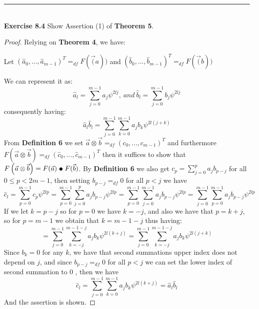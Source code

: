 \documentclass[a4paper]{article}
\begin{document}
\noindent\rule{12cm}{0.4pt}\\
\noindent \textbf{Exercise 8.4}  Show Assertion (1) of \textbf{Theorem 5}.
\begin{proof}
Relying on \textbf{Theorem 4}, we have:
\begin{center}
Let $(\widehat{a}_0,...,\widehat{a}_{m-1})^{T} =_{df}F(\vec(a))$ and $(\widehat{b}_0,...,\widehat{b}_{m-1})^{T} =_{df}F(\vec(b))$
\end{center}
We can represent it as:
$$\widehat{a}_l = \sum_{j=0}^{m-1}a_j\psi^{2lj},\ and\ \widehat{b}_l = \sum_{j=0}^{m-1}b_j\psi^{2lj}$$
consequently having:
$$\widehat{a}_l\widehat{b}_l = \sum_{j=0}^{m-1}\sum_{k=0}^{m-1}a_jb_k\psi^{2l(j+k)}$$
From \textbf{Definition 6} we set $\vec{a} \otimes \vec{b} =_{df}(c_0,...,c_{m-1})^T$ and furthermore $F\left(\vec{a} \otimes \vec{b}\right) =_{df}(\widehat{c}_0,...,\widehat{c}_{m-1})^T$ then it suffices to show that $F\left(\vec{a} \otimes \vec{b}\right) = F(\vec{a})\ \tikz\draw[black,fill=black] (0,0) circle (.5ex);\ F(\vec{b})$. By \textbf{Definition 6} we also get $c_{p}=  \sum_{j=0}^{p}a_{j}b_{p-j}$ for all $ 0 \leq p < 2m-1$, then setting $b_{p-j} =_{df} 0$ for all $p < j$ we have
$$\widehat{c}_l = \sum_{p=0}^{m-1}c_p\psi^{2lp} =  \sum_{p=0}^{m-1}\sum_{j=0}^{p}a_{j}b_{p-j}\psi^{2lp} =  \sum_{p=0}^{m-1}\sum_{j=0}^{m-1}a_{j}b_{p-j}\psi^{2lp} =  \sum_{j=0}^{m-1}\sum_{p=0}^{m-1}a_{j}b_{p-j}\psi^{2lp}$$
If we let $k = p-j$ so for $p =0$ we have $ k = -j$, and also we have that $p=k+j$, so for $p = m - 1$ we obtain that $k = m - 1 - j$ thus having:
$$=  \sum_{j=0}^{m-1}\sum_{k= -j}^{m-1-j}a_{j}b_{k}\psi^{2l(k+j)} = \sum_{j=0}^{m-1}\sum_{k= -j}^{m-1-j}a_{j}b_{k}\psi^{2l(j+k)}$$
Since $b_{k}=0$ for any $k$, we have that second summations upper index does not depend on $j$, and since $b_{p-j} =_{df} 0$ for all $p < j$ we can set the lower index of second summation to 0 , then we have
$$\widehat{c}_l  =  \sum_{j=0}^{m-1}\sum_{k= 0}^{m-1}a_{j}b_{k}\psi^{2l(k+j)}=\widehat{a}_l\widehat{b}_l$$
And the assertion is shown.
\end{proof}
\end{document}
